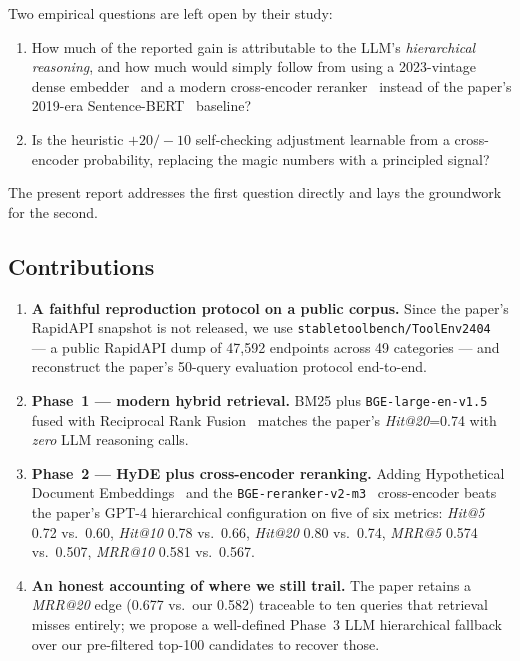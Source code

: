 \documentclass[10pt,a4paper,twocolumn]{article}
\begin{document}
Two empirical questions are left open by their study:
\begin{enumerate}[leftmargin=*]
    \item How much of the reported gain is attributable to the LLM's
          \emph{hierarchical reasoning}, and how much would simply follow
          from using a 2023-vintage dense embedder~\cite{xiao2023cpack}
          and a modern cross-encoder reranker~\cite{nogueira2019passage}
          instead of the paper's 2019-era
          Sentence-BERT~\cite{reimers2019sbert} baseline?
    \item Is the heuristic $+20/-10$ self-checking adjustment learnable
          from a cross-encoder probability, replacing the magic numbers
          with a principled signal?
\end{enumerate}
The present report addresses the first question directly and lays the
groundwork for the second.

\subsection{Contributions}

\begin{enumerate}[leftmargin=*]
    \item \textbf{A faithful reproduction protocol on a public corpus.}
          Since the paper's RapidAPI snapshot is not released, we use
          \texttt{stabletoolbench/ToolEnv2404}~\cite{stabletoolbench2024}
          --- a public RapidAPI dump of 47{,}592 endpoints across 49
          categories --- and reconstruct the paper's 50-query evaluation
          protocol end-to-end.
    \item \textbf{Phase~1 --- modern hybrid retrieval.} BM25 plus
          \texttt{BGE-large-en-v1.5}~\cite{xiao2023cpack} fused with
          Reciprocal Rank Fusion~\cite{cormack2009rrf} matches the
          paper's \emph{Hit@20}=0.74 with \emph{zero} LLM reasoning calls.
    \item \textbf{Phase~2 --- HyDE plus cross-encoder reranking.} Adding
          Hypothetical Document Embeddings~\cite{gao2023hyde} and the
          \texttt{BGE-reranker-v2-m3}~\cite{xiao2023cpack} cross-encoder
          beats the paper's GPT-4 hierarchical configuration on five of
          six metrics: \emph{Hit@5} 0.72 vs.\ 0.60, \emph{Hit@10} 0.78
          vs.\ 0.66, \emph{Hit@20} 0.80 vs.\ 0.74, \emph{MRR@5} 0.574
          vs.\ 0.507, \emph{MRR@10} 0.581 vs.\ 0.567.
    \item \textbf{An honest accounting of where we still trail.} The
          paper retains a \emph{MRR@20} edge (0.677 vs.\ our 0.582)
          traceable to ten queries that retrieval misses entirely; we
          propose a well-defined Phase~3 LLM hierarchical fallback over
          our pre-filtered top-100 candidates to recover those.
\end{enumerate}
\end{document}
